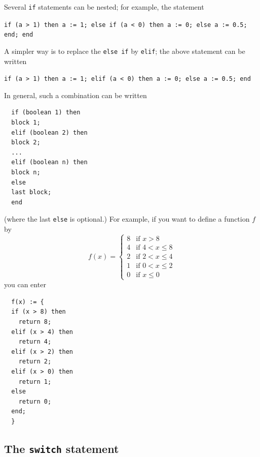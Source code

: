 \documentclass[a4paper,11pt]{book}
\begin{document}
Several \texttt{if} statements can be nested; for example, the statement
\begin{center}
  {\tt if (a > 1) then a := 1; else if (a < 0) then a := 0; else a :=
  0.5; end; end}
\end{center}
A simpler way is to replace the \texttt{else if} by \texttt{elif}; the
above statement can be written
\begin{center}
  {\tt if (a > 1) then a := 1; elif (a < 0) then a := 0; else a :=
  0.5; end}
\end{center}
In general, such a combination can be written
\begin{verbatim}
  if (boolean 1) then
  block 1;
  elif (boolean 2) then
  block 2;
  ... 
  elif (boolean n) then
  block n;
  else
  last block;
  end
\end{verbatim}
(where the last \texttt{else} is optional.)
For example, if you want to define a function $f$ by
\[
f(x) =
  \begin{cases}
   8 & \text{if } x > 8\\
   4 & \text{if } 4 < x \le 8\\
   2 & \text{if } 2 < x \le 4\\
   1 & \text{if } 0 < x \le 2\\
   0 & \text{if } x \le 0
 \end{cases}
\]
you can enter
\begin{verbatim}
  f(x) := {
  if (x > 8) then
    return 8;
  elif (x > 4) then
    return 4;
  elif (x > 2) then
    return 2;
  elif (x > 0) then
    return 1;
  else
    return 0;
  end;
  }
\end{verbatim}

\subsection{The \texttt{switch} statement}
\end{document}
